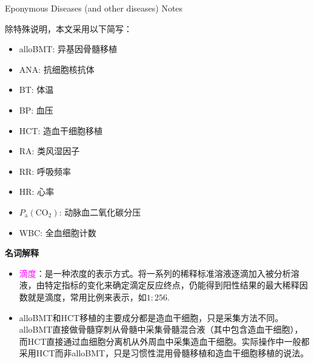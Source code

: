 \documentclass[UTF8]{book}
\date{}
\newcommand{\concept}[1]{\textcolor{magenta}{#1}}
\begin{document}
\kaishu
\begin{center}
\Large{Eponymous Diseases (and other diseases) Notes}
\end{center}
除特殊说明，本文采用以下简写：
\begin{itemize}
\item alloBMT: 异基因骨髓移植
\item ANA: 抗细胞核抗体
\item BT: 体温
\item BP: 血压
\item HCT: 造血干细胞移植
\item RA: 类风湿因子
\item RR: 呼吸频率
\item HR: 心率
\item $P_\mathrm{a}(\mathrm{CO}_2)$: 动脉血二氧化碳分压
\item WBC: 全血细胞计数
\end{itemize}

\newpage

\noindent\textbf{名词解释}
\begin{itemize}
\item \concept{滴度}：是一种浓度的表示方式。将一系列的稀释标准溶液逐滴加入被分析溶液，由特定指标的变化来确定滴定反应终点，仍能得到阳性结果的最大稀释因数就是滴度，常用比例来表示，如$1:256$.
\item alloBMT和HCT移植的主要成分都是造血干细胞，只是采集方法不同。alloBMT直接做骨髓穿刺从骨髓中采集骨髓混合液（其中包含造血干细胞），而HCT直接通过血细胞分离机从外周血中采集造血干细胞。实际操作中一般都采用HCT而非alloBMT，只是习惯性混用骨髓移植和造血干细胞移植的说法。
\end{itemize}
\newpage
\end{document}

